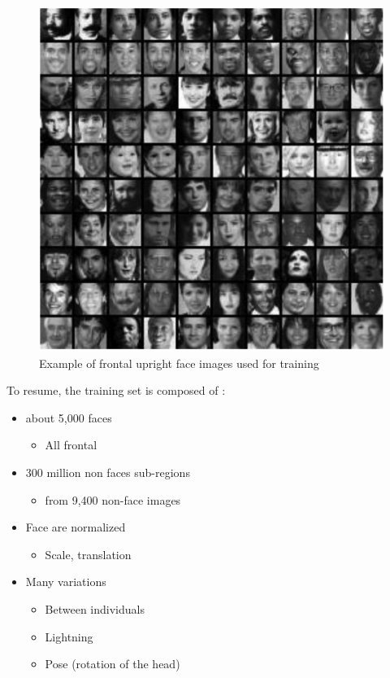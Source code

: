 \begin{figure}[!h]
\begin{center}
\noindent \includegraphics[scale=0.9]{figures/haar_feature_training_dataset} 
\newline
\caption{Example of frontal upright face images used for training}
\label{haar_feature_training_dataset}
\end{center} 
\end{figure}

\noindent To resume, the training set is composed of \cite{UBC01}:

\begin{itemize}
  \item about 5,000 faces
  \begin{itemize}
  	\item All frontal
  \end{itemize}
  \item 300 million non faces sub-regions
  \begin{itemize}
  	\item from 9,400 non-face images
  \end{itemize}
  \item Face are normalized
  \begin{itemize}
  	\item Scale, translation
  \end{itemize}
  \item Many variations
  \begin{itemize}
  	\item Between individuals
	\item Lightning
	\item Pose (rotation of the head)
  \end{itemize}
\end{itemize}

